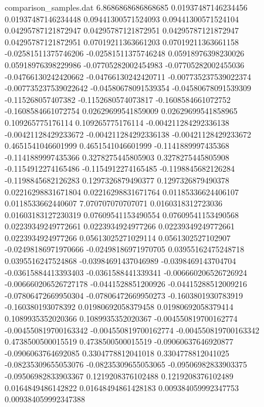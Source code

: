 \begin{filecontents}{comparison_samples.dat}
6.8686868686868685  0.01937487146234456     0.01937487146234448     0.09441300571524093    0.09441300571524104    0.04295787121872947    0.04295787121872951    0.04295787121872947    0.04295787121872951    0.07019211363661203    0.07019211363661158    -0.02581511375746206    -0.02581511375746248    0.05918976398230026    0.05918976398229986    -0.07705282002454983    -0.07705282002455036    -0.04766130242420662    -0.04766130242420711    -0.007735237539022374   -0.007735237539022642   -0.04580678091539354    -0.04580678091539309    -0.115268057407382      -0.1152680574073817     -0.1608584661072752     -0.1608584661072754     0.02629699541859009    0.02629699541858965    0.109265775176114      0.109265775176114      -0.004211284292336138   -0.00421128429233672    -0.004211284292336138   -0.00421128429233672    0.4651541046601999     0.4651541046601999     -0.1141889997435368     -0.1141889997435366     0.3278275445805903     0.3278275445805908     -0.1154912274165486     -0.1154912274165485     -0.1198845682126284     -0.1198845682126283     0.1297326879490377     0.1297326879490378     0.02216298831671804    0.02216298831671764    0.01185336624406107     0.0118533662440607    
7.070707070707071   0.0160318312723036      0.01603183127230319     0.07609541153490554    0.07609541153490568    0.02239349249772661    0.0223934924977266     0.02239349249772661    0.0223934924977266     0.05613025271029114    0.0561302527102907     -0.02498186971970666    -0.02498186971970705    0.03955162475248718    0.0395516247524868     -0.03984691437046989    -0.0398469143704704     -0.03615884413393403    -0.0361588441339341     -0.006660206526726924   -0.006660206526727178   -0.0441528851200926     -0.04415288512009216    -0.07806472669950304    -0.07806472669950273    -0.1603801930783919     -0.160380193078392      0.01980692058379458    0.01980692058379414    0.1089935352020366     0.1089935352020367     -0.004550819700162774   -0.004550819700163342   -0.004550819700162774   -0.004550819700163342   0.4738500500015519     0.4738500500015519     -0.09060637646920877    -0.0906063764692085     0.3304778812041018     0.3304778812041025     -0.08235309655053076    -0.08235309655053065    -0.09506982833903375    -0.09506982833903367    0.1219208376102488     0.1219208376102489     0.0164849486142822     0.01648494861428183    0.009384059992347753    0.009384059992347388  

\end{filecontents}
